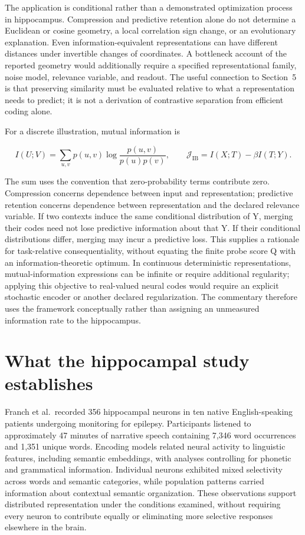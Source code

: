 \documentclass[11pt]{article}
\begin{document}
The application is conditional rather than a demonstrated optimization
process in hippocampus. Compression and predictive retention alone do
not determine a Euclidean or cosine geometry, a local correlation sign
change, or an evolutionary explanation. Even information-equivalent
representations can have different distances under invertible changes of
coordinates. A bottleneck account of the reported geometry would
additionally require a specified representational family, noise model,
relevance variable, and readout. The useful connection to Section~5 is
that preserving similarity must be evaluated relative to what a
representation needs to predict; it is not a derivation of contrastive
separation from efficient coding alone.

For a discrete illustration, mutual information is

\begin{equation}
I(U;V)=\sum_{u,v}p(u,v)\log\frac{p(u,v)}{p(u)p(v)},\qquad
\mathcal J_{\mathrm{IB}}=I(X;T)-\beta I(T;Y).
\end{equation}

The sum uses the convention that zero-probability terms contribute zero.
Compression concerns dependence between input and representation;
predictive retention concerns dependence between representation and the
declared relevance variable. If two contexts induce the same conditional
distribution of Y, merging their codes need not lose predictive
information about that Y. If their conditional distributions differ,
merging may incur a predictive loss. This supplies a rationale for
task-relative consequentiality, without equating the finite probe score
Q with an information-theoretic optimum. In continuous deterministic
representations, mutual-information expressions can be infinite or
require additional regularity; applying this objective to real-valued
neural codes would require an explicit stochastic encoder or another
declared regularization. The commentary therefore uses the framework
conceptually rather than assigning an unmeasured information rate to the
hippocampus.

\hypertarget{what-the-hippocampal-study-establishes}{%
\section{What the hippocampal study
establishes}\label{what-the-hippocampal-study-establishes}}

Franch et al.~recorded 356 hippocampal neurons in ten native
English-speaking patients undergoing monitoring for epilepsy.
Participants listened to approximately 47 minutes of narrative speech
containing 7,346 word occurrences and 1,351 unique words. Encoding
models related neural activity to linguistic features, including
semantic embeddings, with analyses controlling for phonetic and
grammatical information. Individual neurons exhibited mixed selectivity
across words and semantic categories, while population patterns carried
information about contextual semantic organization. These observations
support distributed representation under the conditions examined,
without requiring every neuron to contribute equally or eliminating more
selective responses elsewhere in the brain.
\end{document}
